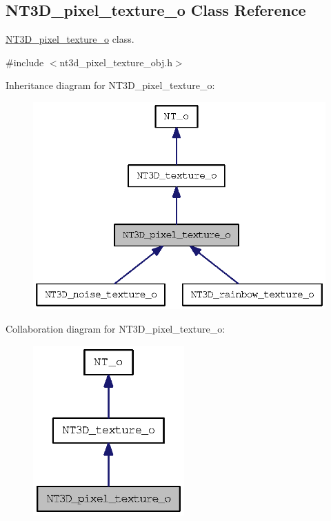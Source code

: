 \subsection{NT3D\_\-pixel\_\-texture\_\-o Class Reference}
\label{class_n_t3_d__pixel__texture__o}


\hyperlink{class_n_t3_d__pixel__texture__o}{NT3D\_\-pixel\_\-texture\_\-o} class.  




{\ttfamily \#include $<$nt3d\_\-pixel\_\-texture\_\-obj.h$>$}



Inheritance diagram for NT3D\_\-pixel\_\-texture\_\-o:
\nopagebreak
\begin{figure}[H]
\begin{center}
\leavevmode
\includegraphics[width=322pt]{class_n_t3_d__pixel__texture__o__inherit__graph}
\end{center}
\end{figure}


Collaboration diagram for NT3D\_\-pixel\_\-texture\_\-o:
\nopagebreak
\begin{figure}[H]
\begin{center}
\leavevmode
\includegraphics[width=164pt]{class_n_t3_d__pixel__texture__o__coll__graph}
\end{center}
\end{figure}
